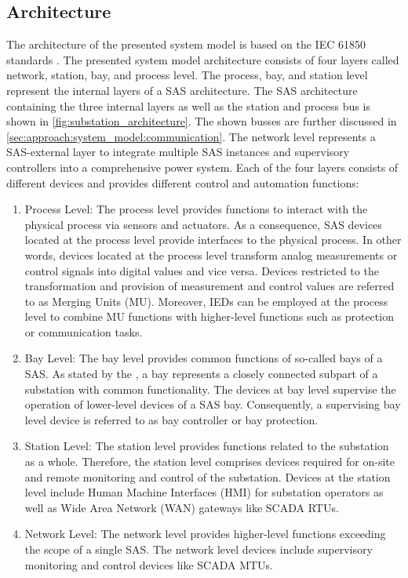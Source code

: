 \subsection{Architecture}
The architecture of the presented system model is based on the IEC 61850 standards \cite{IEC61850P5}.
The presented system model architecture consists of four layers called network, station, bay, and process level.
The process, bay, and station level represent the internal layers of a SAS architecture.
The SAS architecture containing the three internal layers as well as the station and process bus is shown in \autoref{fig:substation_architecture}.
The shown busses are further discussed in \autoref{sec:approach:system_model:communication}.
The network level represents a SAS-external layer to integrate multiple SAS instances and supervisory controllers into a comprehensive power system.
Each of the four layers consists of different devices and provides different control and automation functions:
\begin{enumerate}
    \item Process Level: The process level provides functions to interact with the physical process via sensors and actuators.
    As a consequence, SAS devices located at the process level provide interfaces to the physical process.
    In other words, devices located at the process level transform analog measurements or control signals into digital values and vice versa.
    Devices restricted to the transformation and provision of measurement and control values are referred to as Merging Units (MU).
    Moreover, IEDs can be employed at the process level to combine MU functions with higher-level functions such as protection or communication tasks.

    \item Bay Level: The bay level provides common functions of so-called bays of a SAS.
    As stated by the \citeauthor{IEC61850P5} \cite{IEC61850P5}, a bay represents a closely connected subpart of a substation with common functionality.
    The devices at bay level supervise the operation of lower-level devices of a SAS bay.
    Consequently, a supervising bay level device is referred to as bay controller or bay protection.

    \item Station Level: The station level provides functions related to the substation as a whole.
    Therefore, the station level comprises devices required for on-site and remote monitoring and control of the substation.
    Devices at the station level include Human Machine Interfaces (HMI) for substation operators as well as Wide Area Network (WAN) gateways like SCADA RTUs.

    \item Network Level: The network level provides higher-level functions exceeding the scope of a single SAS.
    The network level devices include supervisory monitoring and control devices like SCADA MTUs.
\end{enumerate}
